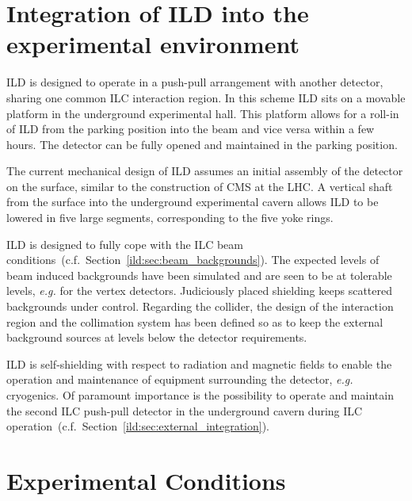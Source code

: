 \section{Integration of ILD into the experimental environment}
ILD is designed to operate in a push-pull arrangement with another detector, sharing one common ILC interaction region. In this scheme ILD sits on a movable platform in the underground experimental hall. This platform allows for a roll-in of ILD from the parking position into the beam and vice versa within a few hours. The detector can be fully opened and maintained in the parking position.

The current mechanical design of ILD assumes an initial assembly of the detector on the surface, similar to the construction of CMS at the LHC. A vertical shaft from the surface into the underground experimental cavern allows ILD to be lowered in five large segments, corresponding to the five yoke rings.

ILD is designed to fully cope with the ILC beam conditions~(c.f.~Section~\ref{ild:sec:beam_backgrounds}). The expected levels of beam induced backgrounds have been simulated and are seen to be at tolerable levels, {\it e.g.} for the vertex detectors. Judiciously placed shielding keeps scattered backgrounds under control. Regarding the collider, the design of the interaction region and the collimation system has been defined so as to keep the external background sources at levels below the detector requirements.

ILD is self-shielding with respect to radiation and magnetic fields to enable the operation and maintenance of equipment surrounding the detector, {\it e.g.} cryogenics. Of paramount importance is the possibility to operate and maintain the second ILC push-pull detector in the underground cavern during ILC operation~(c.f.~Section~\ref{ild:sec:external_integration}).

\section{Experimental Conditions}
 
